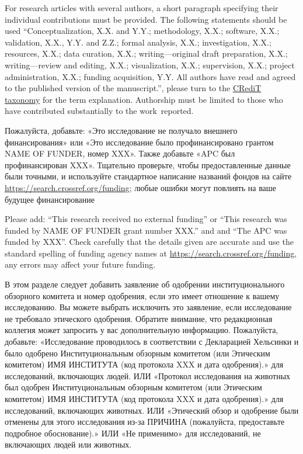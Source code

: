 \documentclass[i-edu.uz,journal,article,submit,pdftex,moreauthors]{Definitions/i-edu.uz}
\begin{document}
\begin{sloppypar}
{\authorcontributions

For research articles with several authors, a short paragraph specifying their individual contributions must be provided. The following statements should be used ``Conceptualization, X.X. and Y.Y.; methodology, X.X.; software, X.X.; validation, X.X., Y.Y. and Z.Z.; formal analysis, X.X.; investigation, X.X.; resources, X.X.; data curation, X.X.; writing---original draft preparation, X.X.; writing---review and editing, X.X.; visualization, X.X.; supervision, X.X.; project administration, X.X.; funding acquisition, Y.Y. All authors have read and agreed to the published version of the manuscript.'', please turn to the  \href{http://img.mdpi.org/data/contributor-role-instruction.pdf}{CRediT taxonomy} for the term explanation. Authorship must be limited to those who have contributed substantially to the work~reported.

\fundingr

{Пожалуйста, добавьте: «Это исследование не получало внешнего финансирования» или «Это исследование было профинансировано грантом NAME OF FUNDER, номер XXX». Также добавьте «APC был профинансирован XXX». Тщательно проверьте, чтобы предоставленные данные были точными, и используйте стандартное написание названий фондов на сайте \url{https://search.crossref.org/funding}; любые ошибки могут повлиять на ваше будущее финансирование}

\funding

{Please add: ``This research received no external funding'' or ``This research was funded by NAME OF FUNDER grant number XXX.'' and  and ``The APC was funded by XXX''. Check carefully that the details given are accurate and use the standard spelling of funding agency names at \url{https://search.crossref.org/funding}, any errors may affect your future funding.}}

\institutionalreviewr

{В этом разделе следует добавить заявление об одобрении институционального обзорного комитета и номер одобрения, если это имеет отношение к вашему исследованию. Вы можете выбрать исключить это заявление, если исследование не требовало этического одобрения. Обратите внимание, что редакционная коллегия может запросить у вас дополнительную информацию. Пожалуйста, добавьте: «Исследование проводилось в соответствии с Декларацией Хельсинки и было одобрено Институциональным обзорным комитетом (или Этическим комитетом) ИМЯ ИНСТИТУТА (код протокола XXX и дата одобрения).» для исследований, включающих людей. ИЛИ «Протокол исследования на животных был одобрен Институциональным обзорным комитетом (или Этическим комитетом) ИМЯ ИНСТИТУТА (код протокола XXX и дата одобрения).» для исследований, включающих животных. ИЛИ «Этический обзор и одобрение были отменены для этого исследования из-за ПРИЧИНА (пожалуйста, предоставьте подробное обоснование).» ИЛИ «Не применимо» для исследований, не включающих людей или животных.}


\end{sloppypar}
\end{document}
